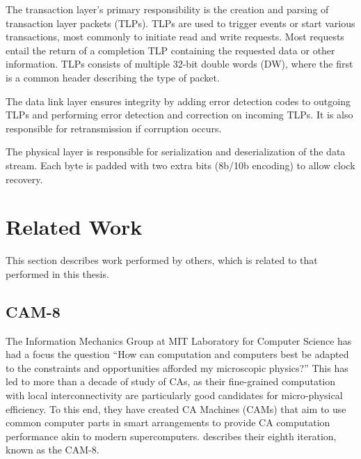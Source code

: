 The transaction layer's primary responsibility is the creation and parsing of transaction layer packets (TLPs).
TLPs are used to trigger events or start various transactions, most commonly to initiate read and write requests\footnotemark.
Most requests entail the return of a completion TLP containing the requested data or other information.
TLPs consists of multiple 32-bit double words (DW), where the first is a common header describing the type of packet.

The data link layer ensures integrity by adding error detection codes to outgoing TLPs and performing error detection and correction on incoming TLPs.
It is also responsible for retransmission if corruption occurs.

The physical layer is responsible for serialization and deserialization of the data stream.
Each byte is padded with two extra bits (8b/10b encoding) to allow clock recovery.


\section{Related Work}

This section describes work performed by others, which is related to that performed in this thesis.


\subsection{CAM-8}

The Information Mechanics Group at MIT Laboratory for Computer Science has had a focus the question ``How can computation and computers best be adapted to the constraints and opportunities afforded my microscopic physics?''
This has led to more than a decade of study of CAs, as their fine-grained computation with local interconnectivity are particularly good candidates for micro-physical efficiency.
To this end, they have created CA Machines (CAMs) that aim to use common computer parts in smart arrangements to provide CA computation performance akin to modern supercomputers.
\cite{margolus1996cam8} describes their eighth iteration, known as the CAM-8.

